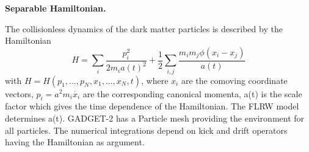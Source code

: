 \centerline{\textbf{Separable Hamiltonian.}}
The collisionless dynamics of the dark matter particles is described by the Hamiltonian
\begin{equation}
H = \sum\limits_{i}\frac{p_i^2}{2m_ia(t)^2} + \frac{1}{2}\sum\limits_{i,j}\frac{m_im_j\phi(x_i - x_j)}{a(t)}
\end{equation}
with $ H = H(p_1,...,p_N,x_1,...,x_N,t)$, where $x_i$ are the comoving coordinate vectors, $p_i = a^2m_i\dot{x_i}$ are the corresponding canonical momenta, a(t) is the scale factor which gives the time dependence of the Hamiltonian. The FLRW model determines a(t). GADGET-2 has a Particle mesh providing the environment for all particles. The numerical integrations depend on kick and drift operators having the Hamiltonian as argument.